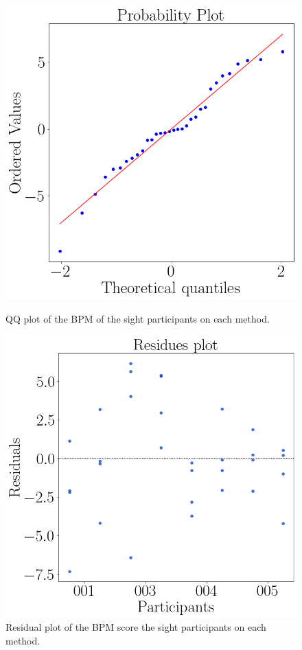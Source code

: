 \begin{figure}[!htb]
    \centering
    \begin{minipage}{0.45\textwidth}
        \centering
        \includegraphics[width = 0.8\linewidth]{Resultados/ECG/Figuras/png/qqplot_bpm_two_way_sight.png}
        \caption{QQ plot of the BPM of the sight participants on each method.}
        \label{fig:qqplot_bpm_two_way_sight}
    \end{minipage}
    \begin{minipage}{0.45\textwidth}
        \centering
        \includegraphics[width = 0.8\linewidth]{Resultados/ECG/Figuras/png/residplot_bpm_two_way_sight.png}
        \caption{Residual plot of the BPM score the sight participants on each method.}
        \label{fig:residplot_bpm_two_way_sight}
    \end{minipage}
\end{figure}

